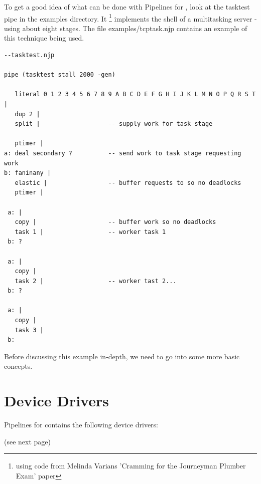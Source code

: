 To get a good idea of what can be done with Pipelines for \nr{}, look at the tasktest
pipe in the examples directory.  It \footnote{using code from Melinda Varians
'Cramming for the Journeyman Plumber Exam' paper} implements the
shell of a  multitasking server - using about eight stages.  The file
examples/tcptask.njp contains an example of this technique being used.
\begin{lstlisting}
--tasktest.njp

pipe (tasktest stall 2000 -gen)

   literal 0 1 2 3 4 5 6 7 8 9 A B C D E F G H I J K L M N O P Q R S T |
   dup 2 |
   split |                   -- supply work for task stage

   ptimer |
a: deal secondary ?          -- send work to task stage requesting work
b: faninany |
   elastic |                 -- buffer requests to so no deadlocks
   ptimer |

 a: |
   copy |                    -- buffer work so no deadlocks
   task 1 |                  -- worker task 1
 b: ?

 a: |
   copy |
   task 2 |                  -- worker tast 2...
 b: ?

 a: |
   copy |
   task 3 |
 b:
\end{lstlisting}

Before discussing this example in-depth, we need to go into some more
basic concepts.

\chapter{Device Drivers}
\label{ch:devicedrivers}
Pipelines for \nr{} contains the following device drivers:

(see next page)

